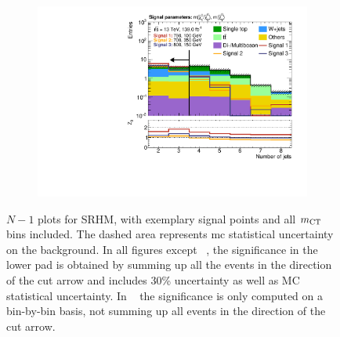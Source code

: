 \begin{figure}
\begin{subfigure}[b]{0.4\linewidth}
		\caption{\label{fig:Wh_reopt_second_round_n1_srhm_mlb1}}
	\end{subfigure}%
	\begin{subfigure}[b]{0.4\linewidth}
		\centering\includegraphics[width=\textwidth]{n1_SRHM_mct_bins/nJet30.pdf}
		\caption{\label{fig:Wh_reopt_second_round_n1_srhm_njet}}
	\end{subfigure}
	\caption{$N-1$ plots for SRHM, with exemplary signal points and all $m_{\textrm{CT}}$ bins included. The dashed area represents \gls{mc} statistical uncertainty on the background. In all figures except \figname~, the significance in the lower pad is obtained by summing up all the events in the direction of the cut arrow and includes 30\% uncertainty as well as MC statistical uncertainty. In \figname~ the significance is only computed on a bin-by-bin basis, \ie not summing up all events in the direction of the cut arrow.}
	\label{fig:Wh_reopt_second_round_n1_srhm}
\end{figure}




